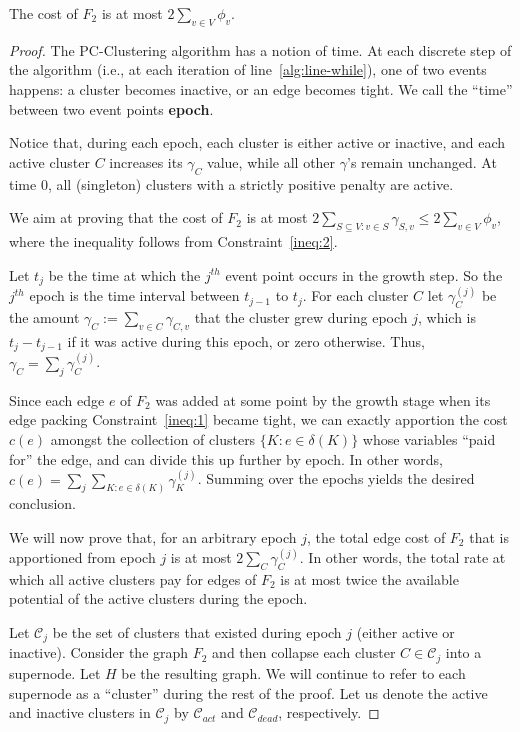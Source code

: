 \begin{flemma} \label{clustering_bound_bateni_3_3}
    The cost of \(F_2\) is at most \(2 \sum_{v \in V} \phi_v\).
\end{flemma}
\begin{proof}
The PC-Clustering algorithm has a notion of time. At each discrete step of the algorithm (i.e., at each iteration of line~\ref{alg:line-while}), one of two events happens: a cluster becomes inactive, or an edge becomes tight. We call the ``time'' between two event points \textbf{epoch}. 

Notice that, during each epoch, each cluster is either active or inactive, and each active cluster \(C\) increases its \(\gamma_C\) value, while all other \(\gamma\)'s remain unchanged. At time \(0\), all (singleton) clusters with a strictly positive penalty are active.

We aim at proving that the cost of \(F_2\) is at most \(2 \sum_{S \subseteq V : v \in S} \gamma_{S, v} \leq 2 \sum_{v \in V} \phi_v\), where the inequality follows from Constraint~\eqref{ineq:2}.

Let \(t_j\) be the time at which the \(j^{th}\) event point occurs in the growth step. So the \(j^{th}\) epoch is the time interval between \(t_{j-1}\) to \(t_j\). For each cluster \(C\) let \(\gamma_{C}^{(j)}\) be the amount \(\gamma_{C}:= \sum_{v \in C} \gamma_{C, v}\) that the cluster grew during epoch \(j\), which is  \(t_j - t_{j-1}\) if it was active during this epoch, or zero otherwise. Thus, \(\gamma_C = \sum_j \gamma_C^{(j)}\).

Since each edge \(e\) of \(F_2\) was added at some point by the growth stage when its edge packing Constraint~\eqref{ineq:1} became tight, we can exactly apportion the cost \(c(e)\) amongst the collection of clusters \(\{K: e \in \delta(K)\}\) whose variables ``paid for'' the edge, and can divide this up further by epoch. In other words, \(c(e) = \sum_j \sum_{K : e \in \delta (K)} \gamma_K^{(j)}\). Summing over the epochs yields the desired conclusion.

We will now prove that, for an arbitrary epoch \(j\), the total edge cost of \(F_2\) that is apportioned from epoch \(j\) is at most \(2 \sum_C \gamma_C^{(j)}\). In other words, the total rate at which all active clusters pay for edges of \(F_2\) is at most twice the available potential of the active clusters during the epoch.

Let \(\mathcal{C}_j\) be the set of clusters that existed during epoch \(j\) (either active or inactive). Consider the graph \(F_2\) and then collapse each cluster \(C \in \mathcal{C}_j\) into a supernode. Let \(H\) be the resulting graph. We will continue to refer to each supernode as a ``cluster'' during the rest of the proof. Let us denote the active and inactive clusters in \(\mathcal{C}_j\) by \(\mathcal{C}_{act}\) and \(\mathcal{C}_{dead}\), respectively.


\end{proof}
